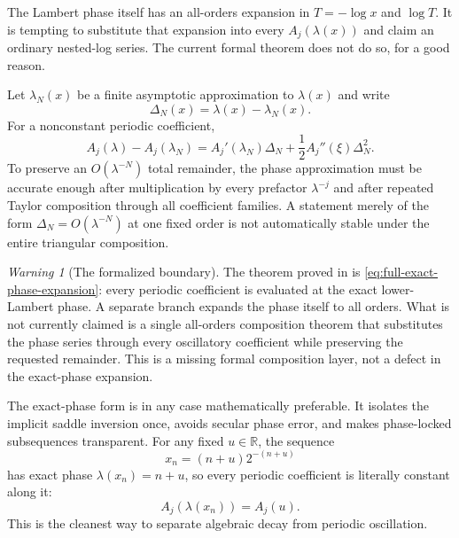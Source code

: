 \documentclass[11pt,oneside]{article}
\theoremstyle{definition}
\theoremstyle{remark}
\newtheorem{warning}[theorem]{Warning}
\newcommand{\R}{\mathbb R}
\begin{document}
The Lambert phase itself has an all-orders expansion in
$T=-\log x$ and $\log T$.  It is tempting to substitute that expansion into every
$A_j(\lambda(x))$ and claim an ordinary nested-log series.  The current formal theorem does
not do so, for a good reason.

Let $\lambda_N(x)$ be a finite asymptotic approximation to $\lambda(x)$ and write
\begin{equation}
 \Delta_N(x)=\lambda(x)-\lambda_N(x).
 \label{eq:phase-error}
\end{equation}
For a nonconstant periodic coefficient,
\begin{equation}
 A_j(\lambda)-A_j(\lambda_N)
 =A_j'(\lambda_N)\Delta_N+\frac12 A_j''(\xi)\Delta_N^2.
 \label{eq:periodic-phase-Taylor}
\end{equation}
To preserve an $O(\lambda^{-N})$ total remainder, the phase approximation must be accurate
enough after multiplication by every prefactor $\lambda^{-j}$ and after repeated Taylor
composition through all coefficient families.  A statement merely of the form
$\Delta_N=O(\lambda^{-N})$ at one fixed order is not automatically stable under the entire
triangular composition.

\begin{warning}[The formalized boundary]
The theorem proved in  is
\eqref{eq:full-exact-phase-expansion}: every periodic coefficient is evaluated at the exact
lower-Lambert phase.  A separate branch expands the phase itself to all orders.  What is not
currently claimed is a single all-orders composition theorem that substitutes the phase
series through every oscillatory coefficient while preserving the requested remainder.
This is a missing formal composition layer, not a defect in the exact-phase expansion.
\end{warning}

The exact-phase form is in any case mathematically preferable.  It isolates the implicit
saddle inversion once, avoids secular phase error, and makes phase-locked subsequences
transparent.  For any fixed $u\in\R$, the sequence
\begin{equation}
 x_n=(n+u)2^{-(n+u)}
 \label{eq:phase-locked-sequence-supp}
\end{equation}
has exact phase $\lambda(x_n)=n+u$, so every periodic coefficient is literally constant
along it:
\begin{equation}
 A_j(\lambda(x_n))=A_j(u).
 \label{eq:phase-locked-coefficients}
\end{equation}
This is the cleanest way to separate algebraic decay from periodic oscillation.
\end{document}
